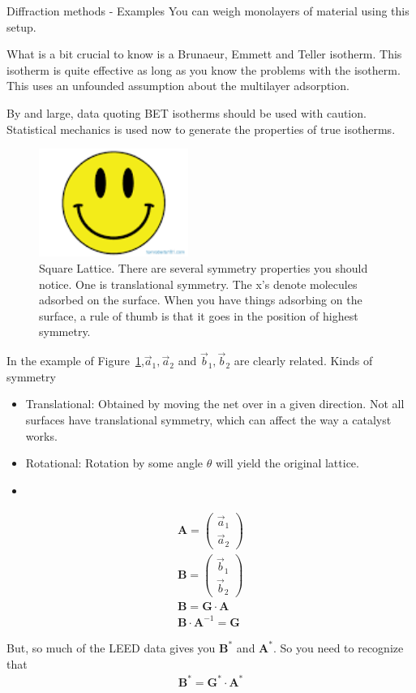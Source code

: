 \documentclass{article}
\newcommand{\matr}[1]{\bm{#1}}
\newcommand{\aone}[0]{\vec{a}_1}
\newcommand{\atwo}[0]{\vec{a}_2}
\newcommand{\bone}[0]{\vec{b}_1}
\newcommand{\btwo}[0]{\vec{b}_2}
\newcommand{\pmat}[1]{\begin{pmatrix}#1\end{pmatrix}}
\begin{document}
\begin{section}{Diffraction methods - Examples}
You can weigh monolayers of material using this setup.

What is a bit crucial to know is a Brunaeur, Emmett and Teller isotherm. This isotherm is quite effective as long as you know the problems with the isotherm. This uses an unfounded assumption about the multilayer adsorption.

By and large, data quoting BET isotherms should be used with caution. Statistical mechanics is used now to generate the properties of true isotherms.

\begin{figure}[h]
	\centering
	\includegraphics[height=100pt]{vacuumChamber}
	\caption{Square Lattice. There are several symmetry properties you should notice. One is translational symmetry. The x's denote molecules adsorbed on the surface. When you have things adsorbing on the surface, a rule of thumb is that it goes in the position of highest symmetry.}
	\label{fig:squareLattice}
\end{figure}
In the example of Figure~\ref{fig:squareLattice},$\aone,\atwo$ and $\vec{b}_1,\vec{b}_2$ are clearly related.
Kinds of symmetry
\begin{itemize}
	\item Translational: Obtained by moving the net over in a given direction. Not all surfaces have translational symmetry, which can affect the way a catalyst works.
	\item Rotational: Rotation by some angle $\theta$ will yield the original lattice.
	\item 
\end{itemize}

\begin{align*}
	\matr{A} = \pmat{\aone\\\atwo}\\
	\matr{B} = \pmat{\bone\\\btwo}\\
	\matr{B} = \matr{G}\cdot\matr{A}\\
	\matr{B}\cdot\matr{A}^{-1}=\matr{G}
\end{align*}

But, so much of the LEED data gives you $\matr{B}^\ast$ and $\matr{A}^\ast$. So you need to recognize that
\begin{align*}
	\matr{B}^\ast = \matr{G}^\ast\cdot \matr{A}^\ast
\end{align*}


\end{section}
\end{document}
